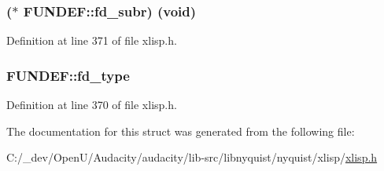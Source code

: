 \subsubsection[{\texorpdfstring{fd\+\_\+subr}{fd_subr}}]{($\ast$ F\+U\+N\+D\+E\+F\+::fd\+\_\+subr) ({\bf void})}\hypertarget{struct_f_u_n_d_e_f_a975ad9770b62d113a0b09849f9933420}{}\label{struct_f_u_n_d_e_f_a975ad9770b62d113a0b09849f9933420}


Definition at line 371 of file xlisp.\+h.

\subsubsection[{\texorpdfstring{fd\+\_\+type}{fd_type}}]{ F\+U\+N\+D\+E\+F\+::fd\+\_\+type}\hypertarget{struct_f_u_n_d_e_f_a45e6bfa885882cf372d92ae76c07a0fd}{}\label{struct_f_u_n_d_e_f_a45e6bfa885882cf372d92ae76c07a0fd}


Definition at line 370 of file xlisp.\+h.



The documentation for this struct was generated from the following file\+:\begin{DoxyCompactItemize}
\item 
C\+:/\+\_\+dev/\+Open\+U/\+Audacity/audacity/lib-\/src/libnyquist/nyquist/xlisp/\hyperlink{xlisp_8h}{xlisp.\+h}\end{DoxyCompactItemize}
